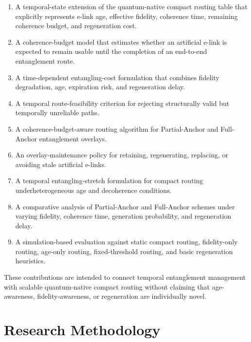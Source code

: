 \begin{enumerate}
    \item A temporal-state extension of the quantum-native compact routing table that explicitly represents e-link age, effective fidelity, coherence time, remaining coherence budget, and regeneration cost.

    \item A coherence-budget model that estimates whether an artificial e-link is expected to remain usable until the completion of an end-to-end entanglement route.

    \item A time-dependent entangling-cost formulation that combines fidelity degradation, age, expiration risk, and regeneration delay.

    \item A temporal route-feasibility criterion for rejecting structurally valid but temporally unreliable paths.

    \item A coherence-budget-aware routing algorithm for Partial-Anchor and Full-Anchor entanglement overlays.

    \item An overlay-maintenance policy for retaining, regenerating, replacing, or avoiding stale artificial e-links.

    \item A temporal entangling-stretch formulation for compact routing underheterogeneous age and decoherence conditions.

    \item A comparative analysis of Partial-Anchor and Full-Anchor schemes under varying fidelity, coherence time, generation probability, and regeneration delay.

    \item A simulation-based evaluation against static compact routing, fidelity-only routing, age-only routing, fixed-threshold routing, and basic regeneration heuristics.
\end{enumerate}

These contributions are intended to connect temporal entanglement management with scalable quantum-native compact routing without claiming that age-awareness, fidelity-awareness, or regeneration are individually novel.
\section{Research Methodology}

